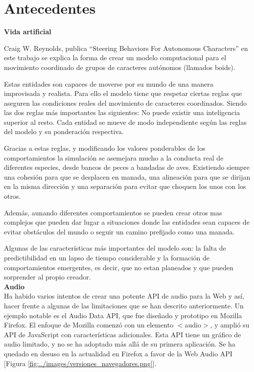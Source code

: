 \section{Antecedentes}
\label{section:antecedentes}
\noindent\textbf{Vida artificial}

Craig W. Reynolds, publica “Steering Behaviors For Autonomous Characters” en este trabajo se explica la forma de crear un modelo computacional para el movimiento 
coordinado de grupos de caracteres autónomos (llamados boids).
 
Estas entidades son capaces de moverse por su mundo de una manera improvisada y realista. Para ello el modelo tiene que respetar ciertas reglas que aseguren las condiciones reales 
del movimiento de caracteres coordinados. Siendo las dos reglas más importantes las siguientes:
No puede existir una inteligencia superior al resto.
Cada entidad se mueve de modo independiente según las reglas del modelo y su ponderación respectiva.
 
Gracias a estas reglas, y modificando los valores ponderables de los comportamientos la simulación se asemejara mucho a la conducta real de diferentes especies, desde bancos de 
peces a bandadas de aves. Existiendo siempre una cohesión para que se desplacen en manada, una alineación para que se dirijan en la misma dirección y una separación para evitar que
choquen los unos con los otros.
 
Además, aunando diferentes comportamientos se pueden crear otros mas complejos que pueden dar lugar a situaciones donde las entidades sean capaces de evitar obstáculos del mundo o 
seguir un camino prefijado como una manada.
 
Algunas de las características más importantes del modelo son: la falta de predictibilidad en un lapso de tiempo considerable y la formación de comportamientos emergentes, es decir, 
que no estan planeados y que pueden sorprender al propio creador.\\

\noindent\textbf{Audio}\\
Ha habido varios intentos de crear una potente API de audio para la Web y así,  hacer frente a algunas de las limitaciones que se han descrito anteriormente.  Un ejemplo notable es el Audio Data API,  que fue diseñado y prototipo en Mozilla Firefox.  El enfoque de Mozilla comenzó con un elemento $<$audio$>$, y amplió su API de JavaScript con características adicionales. Esta API tiene un gráfico de audio limitado, y no se ha adoptado más allá de su primera aplicación. Se ha quedado en desuso en la actualidad en Firefox a favor de la Web Audio API [Figura \ref{fig:../images/versiones_navegadores.png}].

